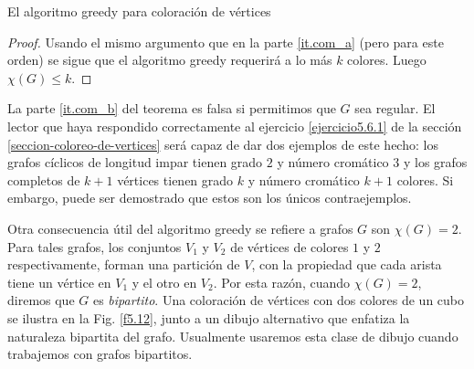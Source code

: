 \begin{section}{El algoritmo greedy para coloración de vértices}
\begin{proof}
Usando el mismo argumento que en la parte \ref{it.com_a} (pero para este orden) se sigue que el algoritmo greedy requerirá a lo más $k$ colores. Luego $\chi(G)\le k$. 
\end{proof}

La parte \ref{it.com_b} del teorema es falsa si permitimos que $G$ sea regular. El lector que haya respondido correctamente al ejercicio \ref{ejercicio5.6.1} de la sección \ref{seccion-coloreo-de-vertices} será capaz de dar dos ejemplos de este hecho:  los grafos cíclicos de longitud impar tienen grado $2$ y número cromático  $3$ y los grafos completos de $k+1$ vértices tienen grado $k$ y número cromático $k+1$ colores. Si embargo, puede ser demostrado que estos son los únicos contraejemplos.

Otra consecuencia útil del algoritmo greedy se refiere a grafos $G$ son $\chi(G)=2$. Para tales grafos, los conjuntos $V_1$ y $V_2$ de vértices de colores $1$ y $2$ respectivamente, forman una partición de $V$, con la propiedad que cada arista tiene un vértice en $V_1$ y el otro en $V_2$. Por esta razón, cuando $\chi(G)=2$, diremos que $G$ es \textit{bipartito}.  Una coloración de vértices con dos colores de un cubo se ilustra en la Fig. \ref{f5.12}, junto a un dibujo alternativo que enfatiza la naturaleza bipartita del grafo. Usualmente usaremos esta clase de dibujo cuando trabajemos con grafos bipartitos.


\end{section}
